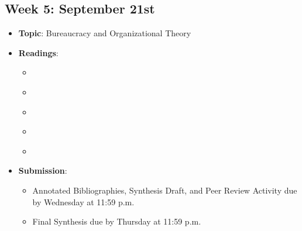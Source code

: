 \documentclass[12pt, letterpaper]{article}
\begin{document}
\subsection*{Week 5: September 21st}
    \begin{itemize}
        \item \textbf{Topic}: Bureaucracy and Organizational Theory
        \item \textbf{Readings}:
            \begin{itemize}
                \item \cite{Brownlow}
                \item \cite{Downs1967}
                \item \cite{Follett1926}
                \item \cite{Kettl2020}
                \item \cite{Schachter2007}
            \end{itemize}
        \item \textbf{Submission}: 
                \begin{itemize}
                    \item Annotated Bibliographies, Synthesis Draft, and Peer Review Activity due by Wednesday at 11:59 p.m. 
                    \item Final Synthesis due by Thursday at 11:59 p.m.
                \end{itemize}
    \end{itemize}
\end{document}
